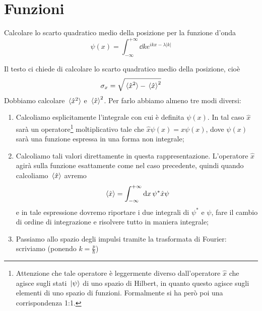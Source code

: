 \chapter{Funzioni}

\begin{esercizio}[(10/06/2019 n°6)\footnotemark]
   Calcolare lo scarto quadratico medio della posizione per la funzione d'onda
   \begin{equation*}
      \psi(x)=\int_{-\infty}^{+\infty} \dd{k} e^{ ikx - \lambda|k| } 
   \end{equation*}
\end{esercizio}
\begin{soluzione}
   Il testo ci chiede di calcolare lo scarto quadratico medio della posizione, cioè
   \begin{equation*}
      \sigma_x=\sqrt{\expval*{\hat{x}^2} - \expval*{\hat{x}}^2}
   \end{equation*}
   Dobbiamo calcolare $\expval*{\hat{x}^2}$ e $\expval*{\hat{x}}^2$. Per farlo abbiamo almeno tre modi diversi:
   \begin{enumerate}
      \item Calcoliamo esplicitamente l'integrale con cui è definita $\psi(x)$. In tal caso $\hat{x}$ sarà un operatore\footnote{Attenzione che tale operatore è leggermente diverso dall'operatore $\hat{x}$ che agisce sugli stati $\ket*{\psi}$ di uno spazio di Hilbert, in quanto questo agisce sugli elementi di uno spazio di funzioni. Formalmente si ha però poi una corrispondenza 1:1.} moltiplicativo tale che $\hat{x}\psi(x)=x\psi(x)$, dove $\psi(x)$ sarà una funzione espressa in una forma non integrale;
      \item Calcoliamo tali valori direttamente in questa rappresentazione. L'operatore $\hat{x}$ agirà sulla funzione esattamente come nel caso precedente, quindi quando calcoliamo $\expval*{\hat{x}}$ avremo
      \begin{equation*}
         \expval*{\hat{x}}=\int_{-\infty}^{+\infty} \dd{x} \psi^* \hat{x} \psi
      \end{equation*}
      e in tale espressione dovremo riportare i due integrali di $\psi^*$ e $\psi$, fare il cambio di ordine di integrazione e risolvere tutto in maniera integrale;
      \item Passiamo allo spazio degli impulsi tramite la trasformata di Fourier: scriviamo (ponendo $k=\frac{p}{\hbar}$)
      \begin{equation*}

\end{equation*}
\end{enumerate}
\end{soluzione}
